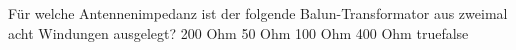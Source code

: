     {Für welche Antennenimpedanz ist der folgende Balun-Transformator aus zweimal acht Windungen ausgelegt?}
    {200 Ohm}
    {50 Ohm}
    {100 Ohm}
    {400 Ohm}
    {true}{false}
